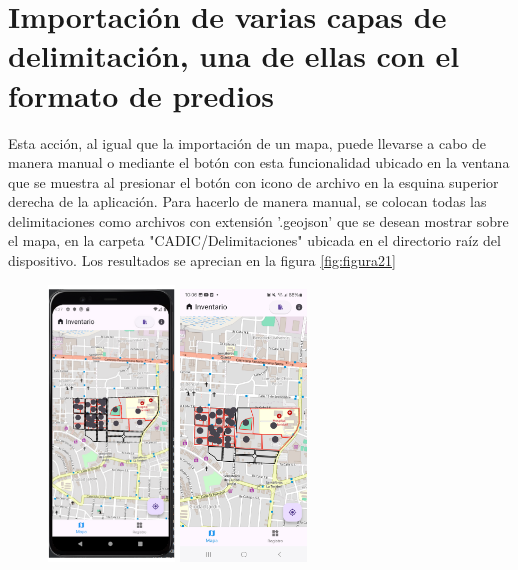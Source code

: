 \section{Importación de varias capas de delimitación, una de ellas con el formato de predios}
Esta acción, al igual que la importación de un mapa, puede llevarse a cabo de manera manual o mediante el botón con esta funcionalidad ubicado en la ventana
que se muestra al presionar el botón con icono de archivo en la esquina superior derecha de la aplicación. Para hacerlo de manera
manual, se colocan todas las delimitaciones como archivos con extensión '.geojson' que se desean mostrar sobre el mapa, en la carpeta "$ $CADIC/Delimitaciones"$ $
ubicada en el directorio raíz del dispositivo. Los resultados se aprecian en la figura \ref{fig:figura21}
\begin{figure}[h]
    \includegraphics[width=0.3\textwidth]{Graphics/Capitulo 4/Pixel 4 [emulador]/4.3/1.png}
    \includegraphics[width=0.3\textwidth]{Graphics/Capitulo 4/Galaxy S23 Ultra Android/4.3/4.jpg}

\end{figure}
